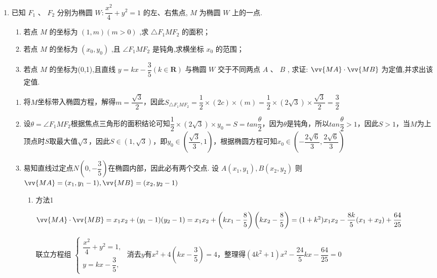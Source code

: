\begin{enumerate}
\begin{enumerate}
    \item 已知 ${F}_{1}$ 、 ${F}_{2}$ 分别为椭圆 $W : \dfrac{{x}^{2}}{4} + {y}^{2} = 1$ 的左、右焦点, $M$ 为椭圆 $W$ 上的一点.
    \begin{enumerate}
        \item 若点 $M$ 的坐标为 $\left( {1,m}\right) \left( {m > 0}\right)$ ,求 $\bigtriangleup {F}_{1}M{F}_{2}$ 的面积；
        \item 若点 $M$ 的坐标为 $\left( {{x}_{0},{y}_{0}}\right)$ ,且 $\angle {F}_{1}M{F}_{2}$ 是钝角,求横坐标 ${x}_{0}$ 的范围；
        \item 若点 $M$ 的坐标为(0,1),且直线 $y = {kx} - \dfrac{3}{5}\left( {k \in  \mathbf{R}}\right)$ 与椭圆 $W$ 交于不同两点 $A\text{ 、 }B$ , 求证: $\vv{MA} \cdot  \vv{MB}$ 为定值,并求出该定值.
    \end{enumerate}
    \begin{jieda}
        \begin{enumerate}
            \item 将$M$坐标带入椭圆方程，解得$m = \dfrac{\sqrt{3}}{2}$，因此$S_{\bigtriangleup {F}_{1}M{F}_{2}} = \dfrac{1}{2} \times (2c) \times (m) = \dfrac{1}{2} \times (2\sqrt{3}) \times \dfrac{\sqrt{3}}{2} = \dfrac{3}{2}$
            \item 设$\theta = \angle{F_1MF_2}$根据焦点三角形的面积结论可知$\dfrac{1}{2} \times (2\sqrt{3}) \times y_0 = S = tan\dfrac{\theta}{2}$，因为$\theta$是钝角，所以$tan\dfrac{\theta}{2} > 1$，因此$S>1$，当$M$为上顶点时$S$取最大值$\sqrt{3}$，因此$S \in (1, \sqrt{3})$，即$y_0 \in \left(\dfrac{\sqrt{3}}{3}, 1\right)$，根据椭圆方程可知$x_0 \in \left(-\dfrac{2\sqrt{6}}{3}, \dfrac{2\sqrt{6}}{3}\right)$
            \item 易知直线过定点$N\left(0, -\dfrac{3}{5}\right)$在椭圆内部，因此必有两个交点. 设 $A\left( {{x}_{1},{y}_{1}}\right) ,B\left( {{x}_{2},{y}_{2}}\right)$ 则$\vv{MA} = (x_1, y_1-1), \vv{MB} = (x_2, y_2-1)$
            \begin{enumerate}[1.]
                \item 方法1
                
                $\vv{MA} \cdot \vv{MB} = x_1x_2+(y_1-1)(y_2-1) = x_1x_2+\left(kx_1-\dfrac{8}{5}\right)\left(kx_2-\dfrac{8}{5}\right) = (1+k^2)x_1x_2-\dfrac{8k}{5}(x_1+x_2)+\dfrac{64}{25}$

                联立方程组 $\left\{  \begin{array}{l} \dfrac{{x}^{2}}{4} + {y}^{2} = 1, \\  y = {kx} - \dfrac{3}{5}, \end{array}\right.$ 消去$y$有$x^2+4\left(kx-\dfrac{3}{5}\right) = 4$，整理得$(4k^2+1)x^2-\dfrac{24}{5}kx-\dfrac{64}{25} = 0$


\end{enumerate}
\end{enumerate}
\end{jieda}
\end{enumerate}
\end{enumerate}
